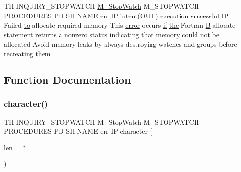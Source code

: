 \begin{DoxyCompactItemize}
TH I\+N\+Q\+U\+I\+R\+Y\+\_\+\+S\+T\+O\+P\+W\+A\+T\+CH \hyperlink{option__stopwatch_83_8txt_aa2011fc45a5e502e87ee50996a8a9305}{M\+\_\+\+Stop\+Watch} M\+\_\+\+S\+T\+O\+P\+W\+A\+T\+CH P\+R\+O\+C\+E\+D\+U\+R\+ES PD SH N\+A\+ME err IP intent(O\+UT) execution successful IP Failed \hyperlink{M__stopwatch_83_8txt_a97209fd3e34ef701c0a9734280779cbb}{to} allocate required memory This \hyperlink{M__stopwatch_83_8txt_ac4611edff506351be87ddb9adfc62315}{error} occurs \hyperlink{exit_87_8txt_a77395982f8d25581c808c40f3b634d90}{if} \hyperlink{M__stopwatch_83_8txt_a0f266597de2e57eb3aa964927bb30e14}{the} Fortran \hyperlink{intro__blas1_83_8txt_a5f157716d3fd55e7b7e08312dc859b58}{B} allocate \hyperlink{M__stopwatch_83_8txt_a43758526aa61bbaa49faf1e287658350}{statement} \hyperlink{M__stopwatch_83_8txt_aee54cdd5349bf498aa96e7f9426a0717}{returns} a nonzero status indicating that memory could not be allocated Avoid memory leaks by always destroying \hyperlink{M__stopwatch_83_8txt_a21c5980264dbe8d8a18083e2dd1ffaa9}{watches} and groups before recreating \hyperlink{inquiry__stopwatch_83_8txt_aba56042309c21e69313821cb6c092c35}{them}
\end{DoxyCompactItemize}


\subsection{Function Documentation}
\mbox{\label{inquiry__stopwatch_83_8txt_ab2e20a25f5ea8f5986290d5c6d860dac}} 
\subsubsection{\texorpdfstring{character()}{character()}}
{\footnotesize\ttfamily TH I\+N\+Q\+U\+I\+R\+Y\+\_\+\+S\+T\+O\+P\+W\+A\+T\+CH \hyperlink{option__stopwatch_83_8txt_aa2011fc45a5e502e87ee50996a8a9305}{M\+\_\+\+Stop\+Watch} M\+\_\+\+S\+T\+O\+P\+W\+A\+T\+CH P\+R\+O\+C\+E\+D\+U\+R\+ES PD SH N\+A\+ME err IP character (\begin{DoxyParamCaption}\item[{len}]{ = {\ttfamily $\ast$} }\end{DoxyParamCaption})}

\mbox{\label{inquiry__stopwatch_83_8txt_a4dada9d717f128f440143c7c9e065435}} 
